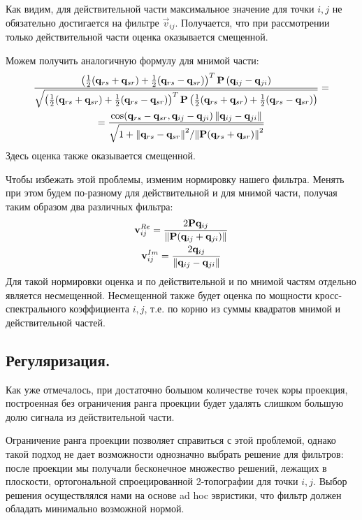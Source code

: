 Как видим, для действительной части максимальное значение для точки $i, j$ не обязательно достигается
на фильтре $\vec{v}_{ij}$.
Получается, что при рассмотрении только действительной части оценка оказывается смещенной.

Можем получить аналогичную формулу для мнимой части:
\begin{multline}
    \frac{\left(\frac{1}{2} (\mathbf{q}_{rs} + \mathbf{q}_{sr}) + \frac{1}{2} (\mathbf{q}_{rs} - \mathbf{q}_{sr})\right)^T\mathbf{P}\left(\mathbf{q}_{ij} - \mathbf{q}_{ji}\right)}
    {\sqrt{\left(\frac{1}{2} (\mathbf{q}_{rs} + \mathbf{q}_{sr}) + \frac{1}{2}
    (\mathbf{q}_{rs} - \mathbf{q}_{sr})\right)^T\mathbf{P}\left(\frac{1}{2} (\mathbf{q}_{rs}
    + \mathbf{q}_{sr}) + \frac{1}{2} (\mathbf{q}_{rs} - \mathbf{q}_{sr})\right)}}  =\\
    = \frac{\cos(\mathbf{q}_{rs} - \mathbf{q}_{sr}, \mathbf{q}_{ij} - \mathbf{q}_{ji}) \left\lVert\mathbf{q}_{ij} - \mathbf{q}_{ji}\right\rVert}
    {\sqrt{1 + {\left\lVert\mathbf{q}_{rs} - \mathbf{q}_{sr}\right\rVert^2}/{\left\lVert\mathbf{P}(\mathbf{q}_{rs} + \mathbf{q}_{sr})\right\rVert^2}}}
\end{multline}
Здесь оценка также оказывается смещенной.

Чтобы избежать этой проблемы, изменим нормировку нашего фильтра. Менять при этом
будем по-разному для действительной и для мнимой части, получая таким образом два различных фильтра:
\begin{gather}
    \mathbf{v}_{ij}^{Re} = \frac{2\mathbf{P}\mathbf{q}_{ij}}{\left\lVert\mathbf{P}(\mathbf{q}_{ij} + \mathbf{q}_{ji})\right\rVert}\\
    \mathbf{v}_{ij}^{Im} = \frac{2\mathbf{q}_{ij}}{\left\lVert\mathbf{q}_{ij} - \mathbf{q}_{ji}\right\rVert}
\end{gather}
Для такой нормировки оценка и по действительной и по мнимой частям отдельно является несмещенной.
Несмещенной также будет оценка по мощности кросс-спектрального коэффициента $i, j$, т.е. по корню
из суммы квадратов мнимой и действительной частей.

\subsection{Регуляризация.}
Как уже отмечалось, при достаточно большом количестве точек коры проекция, построенная
без ограничения ранга проекции будет удалять слишком большую долю сигнала из действительной части.

Ограничение ранга проекции позволяет справиться с этой проблемой, однако такой подход
не дает возможности однозначно выбрать решение для фильтров: после проекции мы получали
бесконечное множество решений, лежащих в плоскости, ортогональной спроецированной 2-топографии
для точки $i, j$. Выбор решения осуществлялся нами на основе ad hoc эвристики, что фильтр должен обладать
минимально возможной нормой.

